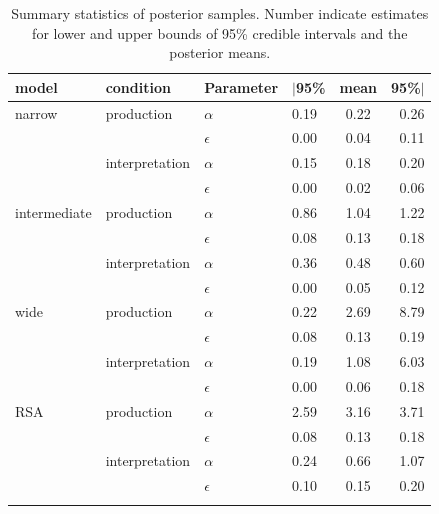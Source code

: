 \documentclass[fleqn]{article}
\begin{document}
\begin{table}[t]
  \centering


  \begin{tabular}{llllcr}
    \toprule \addlinespace[1ex]
    model        & condition      & Parameter  & $|$95\% & mean & 95\%$|$ \\
    \midrule  \addlinespace[1ex]
    narrow       & production     & $\alpha$   & 0.19    & 0.22 & 0.26 \\
                 &                & $\epsilon$ & 0.00    & 0.04 & 0.11 \\
                 & interpretation & $\alpha$   & 0.15    & 0.18 & 0.20 \\
                 &                & $\epsilon$ & 0.00    & 0.02 & 0.06 \\ \addlinespace[0.75ex]
    intermediate & production     & $\alpha$   & 0.86    & 1.04 & 1.22 \\
                 &                & $\epsilon$ & 0.08    & 0.13 & 0.18 \\
                 & interpretation & $\alpha$   & 0.36    & 0.48 & 0.60 \\
                 &                & $\epsilon$ & 0.00    & 0.05 & 0.12 \\ \addlinespace[0.75ex]
    wide         & production     & $\alpha$   & 0.22    & 2.69 & 8.79 \\
                 &                & $\epsilon$ & 0.08    & 0.13 & 0.19 \\
                 & interpretation & $\alpha$   & 0.19    & 1.08 & 6.03 \\
                 &                & $\epsilon$ & 0.00    & 0.06 & 0.18 \\ \addlinespace[0.75ex]
    RSA          & production     & $\alpha$   & 2.59    & 3.16 & 3.71 \\
                 &                & $\epsilon$ & 0.08    & 0.13 & 0.18 \\
                 & interpretation & $\alpha$   & 0.24    & 0.66 & 1.07 \\
                 &                & $\epsilon$ & 0.10    & 0.15 & 0.20 \\ \addlinespace[0.25ex]
    \bottomrule \\
  \end{tabular}

  \caption{
    Summary statistics of posterior samples.
    Number indicate estimates for lower and upper bounds of 95\% credible intervals and the posterior means.
  }
  \label{fig:posterior-stats}
\end{table}
\end{document}
